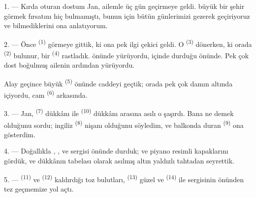 
\VUsaut{4.0mm}
\VUsaut{3.0mm}

\VUsaut{3.0mm}

1. --- Kırda oturan dostum Jan, ailemle üç gün geçirmeye geldi.
 büyük bir şehir görmek fırsatını hiç bulmamıştı, bunun
için bütün günlerimizi gezerek geçiriyoruz ve bilmediklerini ona anlatıyorum.

2. --- Önce  \textsuperscript{(1)} görmeye gittik, ki ona
pek ilgi çekici geldi. O  \textsuperscript{(3)} dönerken, ki orada
 \textsuperscript{(2)} bulunur, bir
 \textsuperscript{(4)} rastladık. 
önünde  yürüyordu, içinde  durduğu
 önünde. Pek çok dost  boğulmuş ailenin
ardından yürüyordu.

Alay geçince büyük  \textsuperscript{(5)} önünde caddeyi
geçtik; orada pek çok  damın altında  içiyordu,
cam  \textsuperscript{(6)} arkasında.

3. --- Jan,  \textsuperscript{(7)} dükkânı ile
 \textsuperscript{(10)} dükkânı arasına asılı o
 şaşırdı. Bana ne demek olduğunu sordu; ingiliz
 \textsuperscript{(8)} nişanı olduğunu söyledim, ve
balkonda duran  \textsuperscript{(9)} ona gösterdim.

\VUsaut{3.0mm}

4. --- Doğallıkla , ,
 ve  sergisi önünde durduk;
 ve piyano  resimli kapaklarını gördük,
ve dükkânın tabelası olarak asılmış altın yaldızlı tahtadan 
seyrettik.

5. ---  \textsuperscript{(11)} ve
 \textsuperscript{(12)} kaldırdığı toz bulutları,
 \textsuperscript{(13)} güzel  ve
 \textsuperscript{(14)}  ile
 sergisinin önünden tez geçmemize yol açtı.

